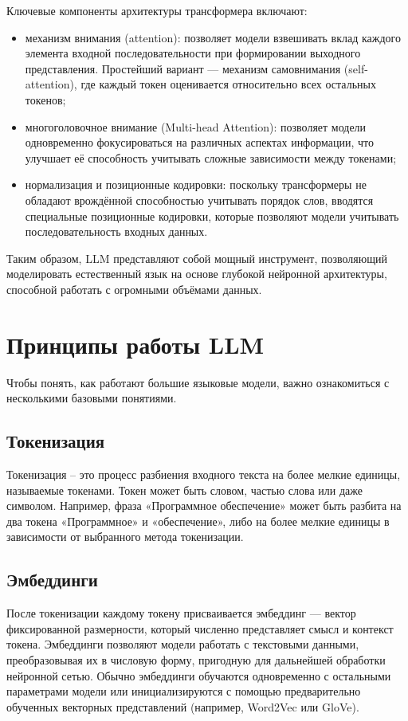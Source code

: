 Ключевые компоненты архитектуры трансформера включают:
\begin{itemize}
    \item 
    механизм внимания (attention): 
    позволяет модели взвешивать вклад каждого элемента входной последовательности при формировании выходного представления. 
    Простейший вариант — механизм самовнимания (self-attention), где каждый токен оценивается относительно всех остальных токенов;
    \item
    многоголовочное внимание (Multi-head Attention): 
    позволяет модели одновременно фокусироваться на различных аспектах информации, что улучшает её способность учитывать сложные зависимости между токенами;
    \item
    нормализация и позиционные кодировки: 
    поскольку трансформеры не обладают врождённой способностью учитывать порядок слов, вводятся специальные позиционные кодировки, 
    которые позволяют модели учитывать последовательность входных данных.

\end{itemize}
    
Таким образом, LLM представляют собой мощный инструмент, позволяющий моделировать естественный язык на основе глубокой нейронной архитектуры, способной работать с огромными объёмами данных.

\section{Принципы работы LLM}

Чтобы понять, как работают большие языковые модели, важно ознакомиться с несколькими базовыми понятиями.

\subsection{Токенизация} 

Токенизация – это процесс разбиения входного текста на более мелкие единицы, называемые токенами. 
Токен может быть словом, частью слова или даже символом. 
Например, фраза «Программное обеспечение» может быть разбита на два токена «Программное» и «обеспечение», 
либо на более мелкие единицы в зависимости от выбранного метода токенизации.

\subsection{Эмбеддинги}

После токенизации каждому токену присваивается эмбеддинг — вектор фиксированной размерности, который численно представляет смысл и контекст токена. 
Эмбеддинги позволяют модели работать с текстовыми данными, преобразовывая их в числовую форму, пригодную для дальнейшей обработки нейронной сетью. 
Обычно эмбеддинги обучаются одновременно с остальными параметрами модели или инициализируются с помощью предварительно обученных векторных представлений (например, Word2Vec или GloVe).

